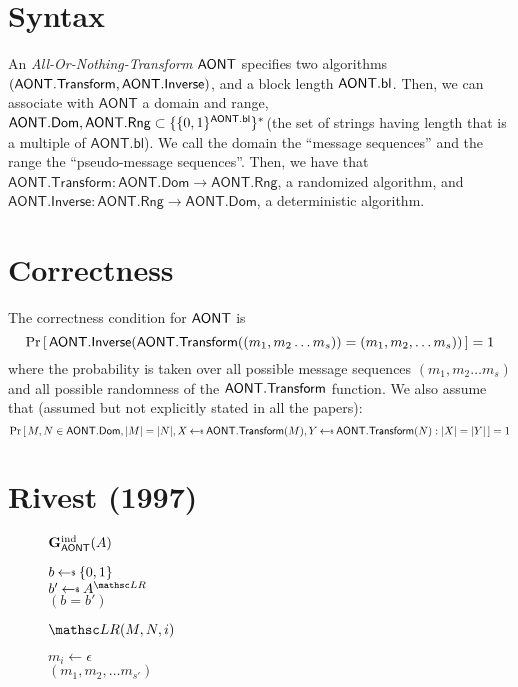\documentclass[11pt,twoside]{article}
\newcommand{\onlyinsubfile}[1]{#1}
\newcommand{\notinsubfile}[1]{}
\begin{document}
    \renewcommand{\onlyinsubfile}[1]{}
    \renewcommand{\notinsubfile}[1]{#1}
  
\section{Syntax}

An \emph{All-Or-Nothing-Transform} $\mathsf{AONT}$ specifies two algorithms $(\mathsf{AONT.Transform}, \mathsf{AONT.Inverse})$, and a block length $\mathsf{AONT.bl}$. Then, we can associate with $\mathsf{AONT}$ a domain and range, $\mathsf{AONT.Dom}, \mathsf{AONT.Rng}\subset \{\{0,1\}^{\mathsf{AONT.bl}}\}^*$(the set of strings having length that is a multiple of $\mathsf{AONT.bl}$). We call the domain the ``message sequences'' and the range the ``pseudo-message sequences''. Then, we have that $\mathsf{AONT.Transform}: \mathsf{AONT.Dom}\rightarrow \mathsf{AONT.Rng}$, a randomized algorithm, and  $\mathsf{AONT.Inverse}: \mathsf{AONT.Rng}\rightarrow \mathsf{AONT.Dom}$, a deterministic algorithm. 


\section{Correctness}
The correctness condition for $\mathsf{AONT}$ is $${\Pr\left[\,{\mathsf{AONT.Inverse}(\mathsf{AONT.Transform}((m_1,m_2\dots m_s))=(m_1,m_2,\dots m_s))}\,\right]} = 1$$ where the probability is taken over all possible message sequences $(m_1,m_2\dots m_s)$ and all possible randomness of the $\mathsf{AONT.Transform}$ function. We also assume that (assumed but not explicitly stated in all the papers): $$\Prob{M,N \in \mathsf{AONT.Dom}, |M|=|N|, X\getsr \mathsf{AONT.Transform}(M), Y \getsr\mathsf{AONT.Transform}(N):|X|=|Y|}=1$$

\section{Rivest (1997)}

\begin{figure}[H]
{
\underline{$\mathbf{G}_{\mathsf{AONT}}^\text{ind}(A)$}

\begin{algorithm}[H]
$b \getsr \bits$\\
$b' \getsr \advA^{\LRO}$\\
\Return $(b=b')$
\end{algorithm}

\smallskip
\underline{$\LRO(M,N,i)$}

\begin{algorithm}[H]
$m_i\gets \epsilon$\\
{\Return $(m_1,m_2,\dots m_{s'})$}
\end{algorithm}
}
\end{figure}
\end{document}
